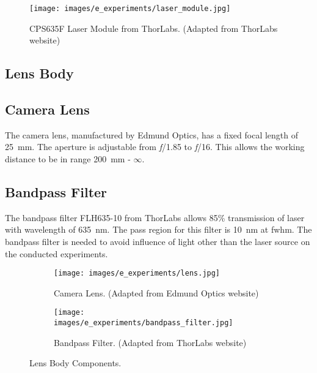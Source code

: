     \begin{figure}[ht]
        \centering
        \texttt{[image: images/e\_experiments/laser\_module.jpg]}
        \caption{CPS635F Laser Module from ThorLabs. (Adapted from ThorLabs website\cite{thorlabs_laser})}
        \label{fig:laser_module.jpg}
    \end{figure}

    \clearpage
    
\subsection{Lens Body}
    \subsection*{Camera Lens}
        The camera lens, manufactured by Edmund Optics, has a fixed focal length of \SI{25}{\milli\meter}. The aperture is adjustable from \emph{f}/1.85 to \emph{f}/16. This allows the working distance to be in range \SI{200}{\milli\meter} - $\infty$.

    \subsection*{Bandpass Filter}
        The bandpass filter FLH635-10 from ThorLabs allows 85\% transmission of laser with wavelength of \SI{635}{\nano\meter}. The pass region for this filter is \SI{10}{\nano\meter} at \gls{fwhm}. The bandpass filter is needed to avoid influence of light other than the laser source on the conducted experiments.

        \begin{figure}[ht]
            \begin{subfigure}{0.5\textwidth}
                \centering
                \texttt{[image: images/e\_experiments/lens.jpg]}
                \caption{Camera Lens. (Adapted from Edmund Optics website\cite{edmund_optics_lens})}
                \label{fig:lens.jpg}
            \end{subfigure}
            \begin{subfigure}{0.5\textwidth}
                \centering
                \texttt{[image: images/e\_experiments/bandpass\_filter.jpg]}
                \caption{Bandpass Filter. (Adapted from ThorLabs website\cite{thorlabs_bandpass_filter})}
                \label{fig:bandpass_filter.jpg}
            \end{subfigure}
            \caption{Lens Body Components.}
            \label{fig:lens_body.jpg}
        \end{figure}

